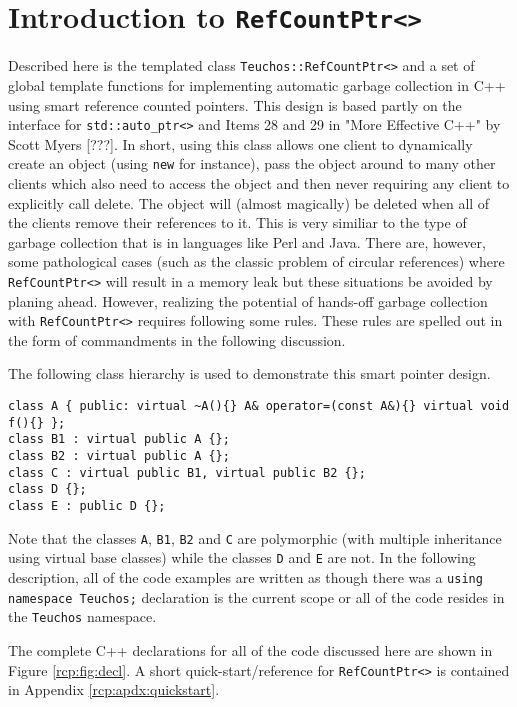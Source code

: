 %
\section{Introduction to \texttt{RefCountPtr<>}}
%

Described here is the templated class \texttt{Teuchos::RefCountPtr<>}
and a set of global template functions for implementing automatic
garbage collection in C++ using smart reference counted pointers.
This design is based partly on the interface for
\texttt{std::auto\_ptr<>} and Items 28 and 29 in "More Effective C++"
by Scott Myers [???]. In short, using this class allows one client to
dynamically create an object (using \texttt{new} for instance), pass
the object around to many other clients which also need to access the
object and then never requiring any client to explicitly call delete.
The object will (almost magically) be deleted when all of the clients
remove their references to it.  This is very similiar to the type of
garbage collection that is in languages like Perl and Java.  There
are, however, some pathological cases (such as the classic problem of
circular references) where \texttt{RefCountPtr<>} will result in a
memory leak but these situations be avoided by planing ahead.
However, realizing the potential of hands-off garbage collection with
\texttt{RefCountPtr<>} requires following some rules.  These rules are
spelled out in the form of commandments in the following discussion.

The following class hierarchy is used to demonstrate this smart
pointer design.
%
{\scriptsize\begin{verbatim}
class A { public: virtual ~A(){} A& operator=(const A&){} virtual void f(){} };
class B1 : virtual public A {};
class B2 : virtual public A {};
class C : virtual public B1, virtual public B2 {};
class D {};
class E : public D {};
\end{verbatim}}
%
Note that the classes \texttt{A}, \texttt{B1}, \texttt{B2} and
\texttt{C} are polymorphic (with multiple inheritance using virtual
base classes) while the classes \texttt{D} and \texttt{E} are not.  In
the following description, all of the code examples are written as
though there was a \texttt{using namespace Teuchos;} declaration is
the current scope or all of the code resides in the
\texttt{Teuchos} namespace.

The complete C++ declarations for all of the code discussed here are
shown in Figure \ref{rcp:fig:decl}.  A short quick-start/reference for
\texttt{RefCountPtr<>} is contained in Appendix
\ref{rcp:apdx:quickstart}.

